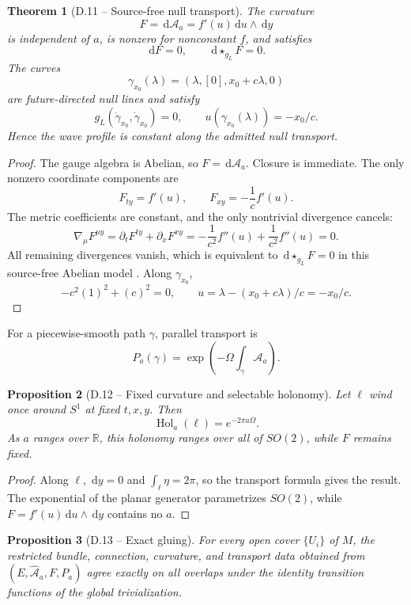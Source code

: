 \documentclass[11pt,letterpaper]{article}
\theoremstyle{dynamicsstyle}
\newtheorem{theorem}{Theorem}[section]
\newtheorem{proposition}[theorem]{Proposition}
\newcommand{\R}{\mathbb{R}}
\newcommand{\Hol}{\operatorname{Hol}}
\newcommand{\dd}{\,\mathrm d}
\begin{document}
\begin{theorem}[D.11 -- Source-free null transport]\label{thm:maxwell}
The curvature
\[
F=\dd\mathcal A_a=f'(u)\dd u\wedge\dd y
\]
is independent of $a$, is nonzero for nonconstant $f$, and satisfies
\[
\dd F=0,
\qquad
\dd\star_{g_L}F=0.
\]
The curves
\[
\gamma_{x_0}(\lambda)
=(\lambda,[0],x_0+c\lambda,0)
\]
are future-directed null lines and satisfy
\[
g_L(\dot\gamma_{x_0},\dot\gamma_{x_0})=0,
\qquad
u(\gamma_{x_0}(\lambda))=-x_0/c.
\]
Hence the wave profile is constant along the admitted null transport.
\end{theorem}

\begin{proof}
The gauge algebra is Abelian, so $F=\dd\mathcal A_a$.  Closure is immediate.  The only nonzero coordinate components are
\[
F_{ty}=f'(u),
\qquad
F_{xy}=-\frac1c f'(u).
\]
The metric coefficients are constant, and the only nontrivial divergence cancels:
\[
\nabla_\mu F^{\mu y}
=\partial_tF^{ty}+\partial_xF^{xy}
=-\frac1{c^2}f''(u)+\frac1{c^2}f''(u)=0.
\]
All remaining divergences vanish, which is equivalent to $\dd\star_{g_L}F=0$ in this source-free Abelian model \cite{Wald}.  Along $\gamma_{x_0}$,
\[
-c^2(1)^2+(c)^2=0,
\qquad
u=\lambda-(x_0+c\lambda)/c=-x_0/c.
\]
\end{proof}

For a piecewise-smooth path $\gamma$, parallel transport is
\[
P_a(\gamma)
=\exp\!\left(-\Omega\int_\gamma\mathcal A_a\right).
\]

\begin{proposition}[D.12 -- Fixed curvature and selectable holonomy]\label{prop:holonomy}
Let $\ell$ wind once around $S^1$ at fixed $t,x,y$.  Then
\[
\Hol_a(\ell)=e^{-2\pi a\Omega}.
\]
As $a$ ranges over $\R$, this holonomy ranges over all of $SO(2)$, while $F$ remains fixed.
\end{proposition}

\begin{proof}
Along $\ell$, $\dd y=0$ and $\int_\ell\eta=2\pi$, so the transport formula gives the result.  The exponential of the planar generator parametrizes $SO(2)$, while $F=f'(u)\dd u\wedge\dd y$ contains no $a$.
\end{proof}

\begin{proposition}[D.13 -- Exact gluing]\label{prop:gluing}
For every open cover $\{U_i\}$ of $M$, the restricted bundle, connection, curvature, and transport data obtained from $(E,\widehat{\mathcal A}_a,F,P_a)$ agree exactly on all overlaps under the identity transition functions of the global trivialization.
\end{proposition}
\end{document}
